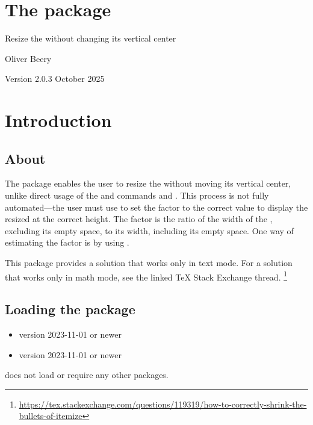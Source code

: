 \documentclass{beery}
\begin{document}
\section*{\Large The  package}

Resize the  without changing its vertical center

Oliver Beery

Version 2.0.3 October 2025


\section{Introduction}
\label{sec:intro}

\subsection{About}
\label{subsec:about}

The  package enables the user to resize the  without moving its vertical center, unlike direct usage of the \LaTeXe{} and  commands  and .
This process is not fully automated---the user must use  to set the  factor to the correct value to display the resized  at the correct height.
The  factor is the ratio of the width of the , excluding its empty space, to its width, including its empty space.
One way of estimating the  factor is by using .

This package provides a solution that works only in text mode.
For a solution that works only in math mode, see the linked \TeX{} Stack Exchange thread.%
\footnote{\url{https://tex.stackexchange.com/questions/119319/how-to-correctly-shrink-the-bullets-of-itemize}}

\subsection{Loading the package}
\label{subsec:loading}

\begin{itemize}
  \item \LaTeXe{} version 2023-11-01 or newer
  \item {} version 2023-11-01 or newer
\end{itemize}

 does not load or require any other packages.
\end{document}
